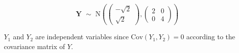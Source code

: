 $$\textbf{Y } \mathtt{\sim} \text{ N}\left(\begin{pmatrix}
-\sqrt{2} \\
\sqrt{2}
\end{pmatrix} , \begin{pmatrix}
2 & 0\\
0  & 4 
\end{pmatrix}\right) $$

$Y_1$ and $Y_2$ are independent variables since $\text{Cov}(Y_1, Y_2) = 0$ according to the covariance matrix of $Y$. 



